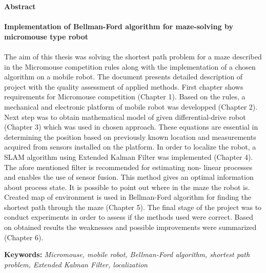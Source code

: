 





\begin{center}
\textbf{Abstract}
\end{center}
\paragraph{Implementation of Bellman-Ford algorithm for maze-solving by micromouse type robot}
\paragraph{}
The aim of this thesis was solving the shortest path problem for a maze described in the Micromouse competition rules along with the implementation of a chosen algorithm on a mobile robot. The document presents detailed description of project with the quality assessment of applied methods. First chapter shows requirements for Micromouse competition (Chapter 1). Based on the rules, a mechanical and electronic platform of mobile robot was developped (Chapter 2). Next step was to obtain mathematical model of given differential-drive robot (Chapter 3) which was used in chosen approach. These equations are essential in determining the position based on previously known location and measurements acquired from sensors installed on the platform. In order to localize the robot, a SLAM algorithm using Extended Kalman Filter was implemented (Chapter 4). The afore mentioned filter is recommended for estimating non- linear processes and enables the use of sensor fusion. This method gives an optimal information about process state. It is possible to point out where in the maze the robot is. Created map of environment is used in Bellman-Ford algorithm for finding the shortest path through the maze (Chapter 5). The final stage of the project was to conduct experiments in order to assess if the methods used were correct. Based on obtained results the weaknesses and possible improvements were summarized (Chapter 6).
\vspace*{\baselineskip}

\noindent\textbf{Keywords:} \textit{Micromouse, mobile robot, Bellman-Ford algorithm, shortest path problem, Extended Kalman Filter, localization}


